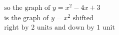 \documentclass[preview]{standalone}
\begin{document}
\begin{align*}
\text{so the graph of $y = x^2 -4x +3$ } \\ \text{is the graph of $y = x^2$ shifted} \\ \text{right by 2 units and down by 1 unit}
\end{align*}
\end{document}
